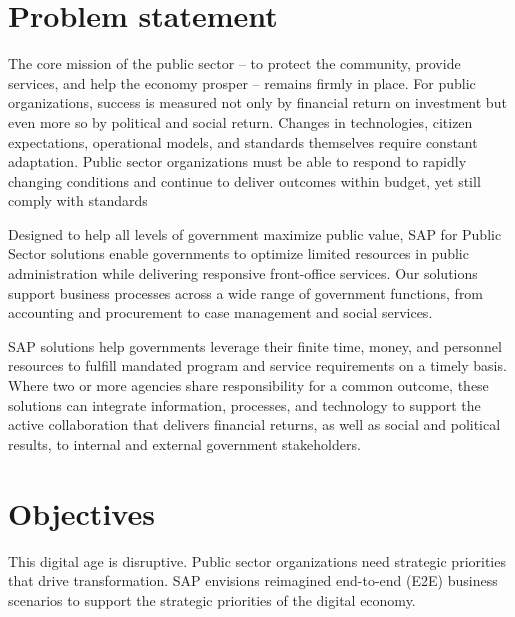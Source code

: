 \section[Problem statement]{\textbf{Problem statement}}

The core mission of the public sector – to protect the community, provide services,
and help the economy prosper – remains firmly in place. For public organizations,
success is measured not only by financial return on investment but even more so by
political and social return. Changes in technologies, citizen expectations, operational
models, and standards themselves require constant adaptation. Public sector
organizations must be able to respond to rapidly changing conditions and continue to
deliver outcomes within budget, yet still comply with standards

Designed to help all levels of government maximize public value, SAP for Public Sector solutions enable governments to optimize limited resources in public administration while delivering responsive front-office services. Our solutions support business processes across a wide range of government functions, from accounting and procurement to case management and social services.

SAP solutions help governments leverage their finite time, money, and personnel resources to fulfill mandated program and service requirements on a timely basis. Where two or more agencies share responsibility for a common outcome, these solutions can integrate information, processes, and technology to support the active collaboration that delivers financial returns, as well as social and political results, to internal and external government stakeholders. 

\section[Objectives]{\textbf{Objectives}}
This digital age is disruptive. Public sector organizations need strategic priorities that drive transformation. SAP envisions reimagined end-to-end (E2E)
business scenarios to support the strategic priorities of the digital economy.

